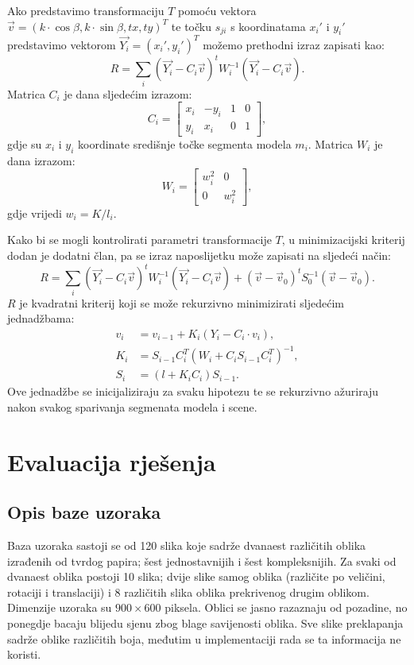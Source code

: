 \documentclass[lmodern, utf8, seminar, numeric]{fer}
\begin{document}
Ako predstavimo transformaciju $T$ pomoću vektora $\vec v=(k\cdot  \cos\beta, k\cdot \sin\beta, tx,t y)^T$ te točku $s_{ji}$  s koordinatama $x_i'$ i $y_i'$ predstavimo vektorom $\vec{Y_i}=(x_i',y_i')^T$ možemo prethodni izraz zapisati kao:
$$R=\sum_i(\vec{Y_i}-C_i\vec v)^t W_i^{-1}(\vec{Y_i}-C_i\vec v).$$
Matrica $C_i$ je dana sljedećim izrazom:
$$C_i = \left [ \begin{array}{cccc}
x_i & -y_i & 1 & 0\\
y_i & x_i & 0 & 1
\end{array} \right ],$$
gdje su $x_i$ i $y_i$ koordinate središnje točke segmenta modela $m_i$. Matrica $W_i$ je dana izrazom:
$$W_i = \left [ \begin{array}{cc}
w_i^2 & 0\\
0 & w_i^2
\end{array} \right ],$$
gdje vrijedi $w_i = K/l_i$.

Kako bi se mogli kontrolirati parametri transformacije $T$, u minimizacijski kriterij dodan je dodatni član, pa se izraz naposlijetku može zapisati na sljedeći način:
$$R=\sum_i(\vec{Y_i}-C_i\vec v)^t W_i^{-1}(\vec{Y_i}-C_i\vec v)+(\vec v - \vec v_0)^tS_0^{-1}(\vec v-\vec v_0).$$
$R$ je kvadratni kriterij koji se može rekurzivno minimizirati sljedećim jednadžbama:
\begin{align*}
v_i & = v_{i-1}+K_i(Y_i-C_i\cdot v_i),\\
K_i & = S_{i-1}C_i^T(W_i+C_iS_{i-1}C_i^T)^{-1},\\
S_i & = (l+K_iC_i)S_{i-1}.
\end{align*}
Ove jednadžbe se inicijaliziraju za svaku hipotezu te se rekurzivno ažuriraju nakon svakog sparivanja segmenata modela i scene.

\chapter{Evaluacija rješenja}
\section{Opis baze uzoraka}
Baza uzoraka sastoji se od 120 slika koje sadrže dvanaest različitih oblika izrađenih od tvrdog papira; šest jednostavnijih i šest kompleksnijih. Za svaki od dvanaest oblika postoji 10 slika; dvije slike samog oblika (različite po veličini, rotaciji i translaciji) i 8 različitih slika oblika prekrivenog drugim oblikom. Dimenzije uzoraka su $900 \times 600$ piksela. Oblici se jasno razaznaju od pozadine, no ponegdje bacaju blijedu sjenu zbog blage savijenosti oblika. Sve slike preklapanja sadrže oblike različitih boja, međutim u implementaciji rada se ta informacija ne koristi.
\end{document}
